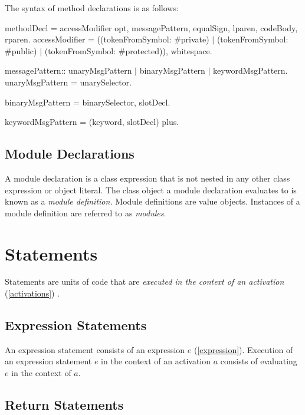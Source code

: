 \documentclass{article}
\begin{document}
The syntax of method declarations is as follows:

\begin{newspeak}
methodDecl = accessModifier opt, messagePattern, equalSign, 
                  lparen, codeBody, rparen.
accessModifier =  ((tokenFromSymbol: {\#private}) $|$ 
                        (tokenFromSymbol: \#public) $|$
                        (tokenFromSymbol: \#protected)), whitespace.
                    
messagePattern::  unaryMsgPattern $|$
                       binaryMsgPattern $|$
                       keywordMsgPattern.
unaryMsgPattern = unarySelector.

binaryMsgPattern = binarySelector, slotDecl.  
                                                         
keywordMsgPattern = (keyword, slotDecl) plus.   
\end{newspeak}


\subsection{Module Declarations} 
\label{module}

A module declaration is a class expression that is not nested in any other class expression or object literal.  The class object a module declaration evaluates to is known as a {\em module definition.} Module definitions are value objects.  Instances of a module definition are referred to as {\em modules}.


\section{Statements}
\label{statement}

Statements are units of code that are {\em executed in the context of an activation}  (\ref{activations}) .


\subsection{Expression Statements}
\label{expr}

An expression statement consists of an expression $e$  (\ref{expression}). Execution of an expression statement $e$ in the context of an activation $a$ consists of evaluating $e$ in the context of $a$. 


\subsection{Return Statements}
\label{return}
\end{document}
